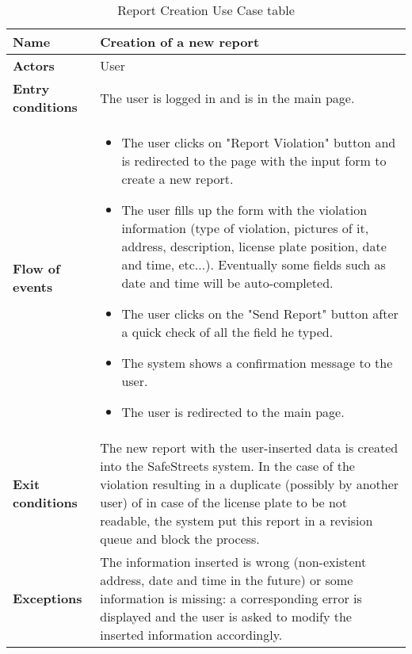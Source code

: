 \begin{table}[!htbp]
	\centering
	\begin{tabular}{lp{9cm}}
\bf\large Name&\bf\large Creation of a new report\\
\hline
\hline
\bf Actors&User\\
\hline
\bf Entry conditions&The user is logged in and is in the main page.\\
\hline
\bf Flow of events&
\begin{itemize}

\item The user clicks on "Report Violation" button and is redirected to the page with the input form to create a new report.

\item The user fills up the form with the violation information (type of violation, pictures of it, address, description, license plate position, date and time, etc...). Eventually some fields such as date and time will be auto-completed.

\item The user clicks on the "Send Report" button after a quick check of all the field he typed.

\item The system shows a confirmation message to the user. 

\item The user is redirected to the main page.

\end{itemize}
\\
\hline
\bf Exit conditions&The new report with the user-inserted data is created into the SafeStreets system. In the case of the violation resulting in a duplicate (possibly by another user) of in case of the license plate to be not readable, the system put this report in a revision queue and block the process.\\
\hline
\bf Exceptions&The information inserted is wrong (non-existent address, date and time in the future) or some information is missing: a corresponding error is displayed and the user is asked to modify the inserted information accordingly.
\\
\hline

\end{tabular}
\caption{Report Creation Use Case table}
 \label{tab:reportcreationtab}
\end{table}